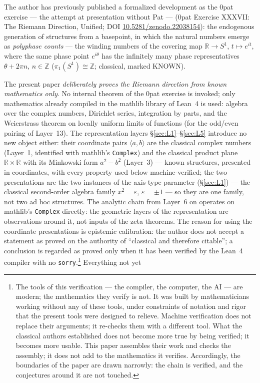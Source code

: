 \documentclass{article}
\newcommand{\R}{\mathbb{R}}
\newcommand{\Z}{\mathbb{Z}}
\begin{document}
The author has previously published a formalized development as the
0pat exercise --- the attempt at presentation without Pat ---
(0pat Exercise XXXVII: The Riemann Direction,
Unified; DOI
\href{https://doi.org/10.5281/zenodo.22038154}{10.5281/zenodo.22038154}):
the endogenous generation of
structures from a basepoint, in which the natural numbers emerge as
\emph{polyphase counts} --- the winding numbers of the covering map
$\R\to S^1$, $t\mapsto e^{it}$, where the same phase point $e^{i\theta}$ has
the infinitely many phase representatives $\theta+2\pi n$, $n\in\Z$
($\pi_1(S^1)\cong\Z$; classical, marked KNOWN).

The present paper \emph{deliberately proves the Riemann direction from known
mathematics only}. No internal theorem of the 0pat exercise is invoked;
only mathematics already compiled in the mathlib library of Lean~4 is used:
algebra over the complex numbers, Dirichlet series, integration by parts,
and the Weierstrass theorem on locally uniform limits of functions (for the
odd/even pairing of Layer~13). The representation layers
\S\ref{sec:L1}--\S\ref{sec:L5} introduce no new object either: their
coordinate pairs $\langle a,b\rangle$ are the classical complex numbers
(Layer~1, identified with mathlib's \texttt{Complex}) and the classical
product plane $\mathbb R\times\mathbb R$ with its Minkowski form
$a^2-b^2$ (Layer~3) --- known
structures, presented in coordinates, with every property used below
machine-verified; the two presentations are the two instances of the
axis-type parameter (\S\ref{sec:L1}) --- the classical second-order
algebra family $x^2=\varepsilon$, $\varepsilon=\pm1$ --- so they are
one family, not two ad hoc structures. The analytic chain from
Layer~6 on operates on
mathlib's \texttt{Complex} directly: the geometric layers of the
representation are observations around it, not inputs of the zeta
theorems. The reason for using the coordinate presentations is
epistemic calibration: the author does
not accept a statement as proved on the authority of ``classical and
therefore citable''; a conclusion is regarded as proved only when it has been
verified by the Lean~4 compiler with no \texttt{sorry}.\footnote{The
tools of this verification --- the compiler, the computer, the AI ---
are modern; the mathematics they verify is not. It was built by
mathematicians working without any of these tools, under constraints of
notation and rigor that the present tools were designed to relieve.
Machine verification does not replace their arguments; it re-checks
them with a different tool. What the classical authors established does
not become more true by being verified; it becomes more usable. This
paper assembles their work and checks the assembly; it does not add to
the mathematics it verifies. Accordingly, the boundaries of the paper
are drawn narrowly: the chain is verified, and the conjectures around
it are not touched.} Everything not yet
\end{document}
